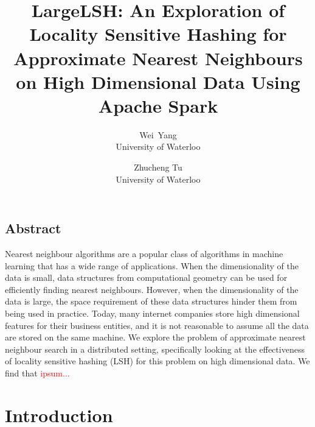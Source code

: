 \documentclass[letterpaper,twocolumn,10pt]{article}
\theoremstyle{definition}
\newcommand{\red}[1]{\textcolor{red}{#1}}
\begin{document}
\date{}

\title{\Large \bf LargeLSH: An Exploration of Locality Sensitive 
Hashing for Approximate Nearest Neighbours on High Dimensional Data Using Apache 
Spark}

\author{
{\rm Wei\ Yang}\\
University of Waterloo
\and
{\rm Zhucheng Tu}\\
University of Waterloo
} %

\maketitle

\thispagestyle{empty}


\subsection*{Abstract}

Nearest neighbour algorithms are a popular class of algorithms in machine learning 
that has a wide range of applications. When the dimensionality of the data is 
small, data structures from computational geometry can be used  
for efficiently finding nearest neighbours. However, when the dimensionality of the 
data is large, the space requirement of these data structures hinder them from 
being used in practice. Today, many internet companies store high dimensional 
features for their business entities, and it is not reasonable to assume all the 
data are stored on the same machine. We explore the problem of approximate nearest 
neighbour search in a distributed setting, specifically looking at the 
effectiveness of locality sensitive hashing (LSH) for this problem on high 
dimensional data. We find that \red{ipsum...}


\section{Introduction}
\end{document}
